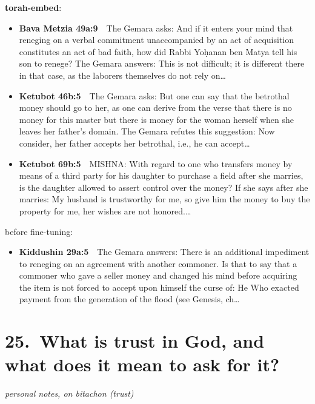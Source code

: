 \documentclass[11pt,a4paper]{article}
\begin{document}
{\color{quiet}\small\textbf{torah-embed}:}
\begin{itemize}[leftmargin=1.2em,itemsep=3pt]
\item {\color{ref}\textbf{Bava Metzia 49a:9}}\ \ The Gemara asks: And if it enters your mind that reneging on a verbal commitment unaccompanied by an act of acquisition constitutes an act of bad faith, how did Rabbi Yoḥanan ben Matya tell his son to renege? The Gemara answers: This is not difficult; it is different there in that case, as the laborers themselves do not rely on\ldots
\item {\color{ref}\textbf{Ketubot 46b:5}}\ \ The Gemara asks: But one can say that the betrothal money should go to her, as one can derive from the verse that there is no money for this master but there is money for the woman herself when she leaves her father’s domain. The Gemara refutes this suggestion: Now consider, her father accepts her betrothal, i.e., he can accept\ldots
\item {\color{ref}\textbf{Ketubot 69b:5}}\ \ MISHNA: With regard to one who transfers money by means of a third party for his daughter to purchase a field after she marries, is the daughter allowed to assert control over the money? If she says after she marries: My husband is trustworthy for me, so give him the money to buy the property for me, her wishes are not honored.\ldots
\end{itemize}
{\color{quiet}\small before fine-tuning:}
\begin{itemize}[leftmargin=1.2em]
\item {\color{ref}\textbf{Kiddushin 29a:5}}\ \ The Gemara answers: There is an additional impediment to reneging on an agreement with another commoner. Is that to say that a commoner who gave a seller money and changed his mind before acquiring the item is not forced to accept upon himself the curse of: He Who exacted payment from the generation of the flood (see Genesis, ch\ldots
\end{itemize}

\section*{25.\ What is trust in God, and what does it mean to ask for it?}
{\color{quiet}\small\textit{personal notes, on bitachon (trust)}}
\end{document}

